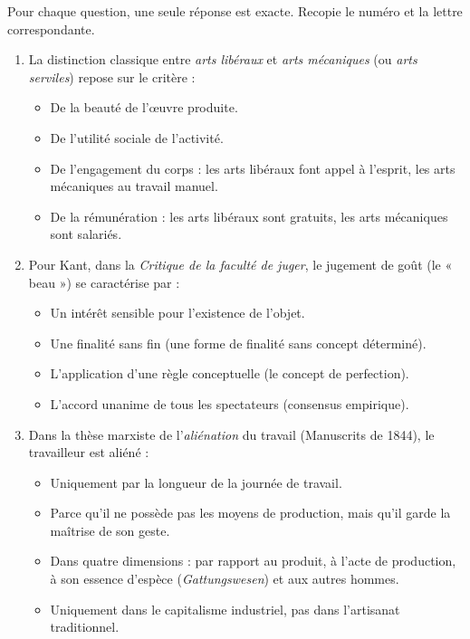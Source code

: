 \documentclass[11pt]{article}
\begin{document}
\begin{exercice}
Pour chaque question, une seule réponse est exacte. Recopie le numéro et la lettre correspondante.
\begin{enumerate}
\item La distinction classique entre \emph{arts libéraux} et \emph{arts mécaniques} (ou \emph{arts serviles}) repose sur le critère :
\begin{itemize}
\item[A.] De la beauté de l'œuvre produite.
\item[B.] De l'utilité sociale de l'activité.
\item[C.] De l'engagement du corps : les arts libéraux font appel à l'esprit, les arts mécaniques au travail manuel.
\item[D.] De la rémunération : les arts libéraux sont gratuits, les arts mécaniques sont salariés.
\end{itemize}

\item Pour Kant, dans la \emph{Critique de la faculté de juger}, le jugement de goût (le « beau ») se caractérise par :
\begin{itemize}
\item[A.] Un intérêt sensible pour l'existence de l'objet.
\item[B.] Une finalité sans fin (une forme de finalité sans concept déterminé).
\item[C.] L'application d'une règle conceptuelle (le concept de perfection).
\item[D.] L'accord unanime de tous les spectateurs (consensus empirique).
\end{itemize}

\item Dans la thèse marxiste de l'\emph{aliénation} du travail (Manuscrits de 1844), le travailleur est aliéné :
\begin{itemize}
\item[A.] Uniquement par la longueur de la journée de travail.
\item[B.] Parce qu'il ne possède pas les moyens de production, mais qu'il garde la maîtrise de son geste.
\item[C.] Dans quatre dimensions : par rapport au produit, à l'acte de production, à son essence d'espèce (\emph{Gattungswesen}) et aux autres hommes.
\item[D.] Uniquement dans le capitalisme industriel, pas dans l'artisanat traditionnel.
\end{itemize}


\end{enumerate}
\end{exercice}
\end{document}
